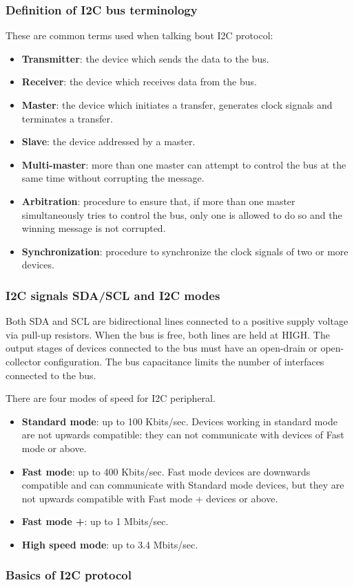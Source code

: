 \subsubsection{Definition of I2C bus terminology}
These are common terms used when talking bout I2C protocol:

\begin{itemize}
	\item	\textbf{Transmitter}: the device which sends the data to the bus.
	\item	\textbf{Receiver}: the device which receives data from the bus.
	\item	\textbf{Master}: the device which initiates a transfer, generates clock signals and terminates a transfer.
	\item	\textbf{Slave}: the device addressed by a master.
	\item	\textbf{Multi-master}: more than one master can attempt to control the bus at the same time without corrupting the message.
	\item	\textbf{Arbitration}: procedure to ensure that, if more than one master simultaneously tries to control the bus, only one is allowed to do so and the winning message is not corrupted.
	\item	\textbf{Synchronization}: procedure to synchronize the clock signals of two or more devices.
\end{itemize}

\subsubsection{I2C signals SDA/SCL and I2C modes}
Both SDA and SCL are bidirectional lines connected to a positive supply voltage via pull-up resistors. When the bus is free, both lines are held at HIGH. The output stages of devices connected to the bus must have an open-drain or open-collector configuration. The bus capacitance limits the number of interfaces connected to the bus.

\noindent There are four modes of speed for I2C peripheral.

\begin{itemize}
	\item		\textbf{Standard mode}: up to 100 Kbits/sec. Devices working in standard mode are not upwards compatible: they can not communicate with devices of Fast mode or above.
	\item		\textbf{Fast mode}:	up to 400 Kbits/sec. Fast mode devices are downwards compatible and can communicate with Standard mode devices, but they are not upwards compatible with Fast mode + devices or above.
	\item		\textbf{Fast mode +}:		up to 1 Mbits/sec.
	\item		\textbf{High speed mode}:	up to 3.4 Mbits/sec.
\end{itemize}

\subsubsection{Basics of I2C protocol}

















